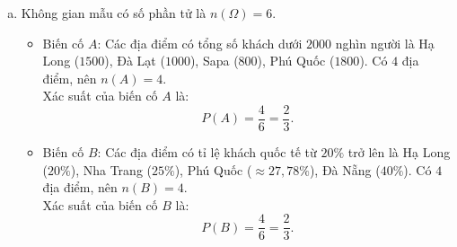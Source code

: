 \begin{bt}
{\begin{enumerate}[a)]
\begin{itemize}
		\item Đà Nẵng: $\dfrac{1200}{1800 + 1200} = \dfrac{1200}{3000} = 40\%$.
	\end{itemize}
	Vậy địa điểm có tỉ lệ khách quốc tế cao nhất là Đà Nẵng ($40\%$), thấp nhất là Đà Lạt và Sapa ($10\%$).
	\item Không gian mẫu có số phần tử là $n(\Omega) = 6$.
	\begin{itemize}
		\item Biến cố $A$: Các địa điểm có tổng số khách dưới $2000$ nghìn người là Hạ Long ($1500$), Đà Lạt ($1000$), Sapa ($800$), Phú Quốc ($1800$). Có $4$ địa điểm, nên $n(A) = 4$.\\
		Xác suất của biến cố $A$ là:
		$$P(A) = \dfrac{4}{6} = \dfrac{2}{3}.$$
		\item Biến cố $B$: Các địa điểm có tỉ lệ khách quốc tế từ $20\%$ trở lên là Hạ Long ($20\%$), Nha Trang ($25\%$), Phú Quốc ($\approx 27{,}78\%$), Đà Nẵng ($40\%$). Có $4$ địa điểm, nên $n(B) = 4$.\\
		Xác suất của biến cố $B$ là:
		$$P(B) = \dfrac{4}{6} = \dfrac{2}{3}.$$
	\end{itemize}
\end{enumerate}
}
\end{bt}

